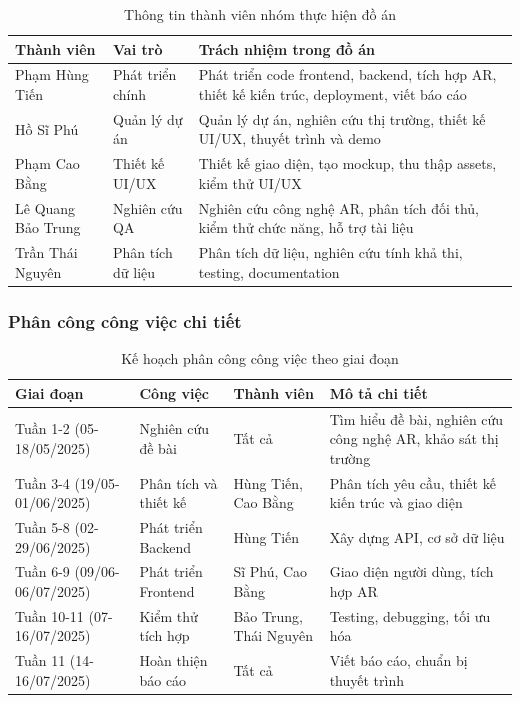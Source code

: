 \documentclass[12pt,a4paper]{article}
\begin{document}
\begin{table}[H]
\centering
\caption{Thông tin thành viên nhóm thực hiện đồ án}
\label{tab:team-members}
\begin{tabular}{@{}>{\raggedright\arraybackslash}p{3cm}>{\raggedright\arraybackslash}p{3cm}>{\raggedright\arraybackslash}p{6cm}@{}}
\toprule
\textbf{Thành viên} & \textbf{Vai trò} & \textbf{Trách nhiệm trong đồ án} \\
\midrule
Phạm Hùng Tiến & Phát triển chính & Phát triển code frontend, backend, tích hợp AR, thiết kế kiến trúc, deployment, viết báo cáo \\
Hồ Sĩ Phú & Quản lý dự án & Quản lý dự án, nghiên cứu thị trường, thiết kế UI/UX, thuyết trình và demo \\
Phạm Cao Bằng & Thiết kế UI/UX & Thiết kế giao diện, tạo mockup, thu thập assets, kiểm thử UI/UX \\
Lê Quang Bảo Trung & Nghiên cứu QA & Nghiên cứu công nghệ AR, phân tích đối thủ, kiểm thử chức năng, hỗ trợ tài liệu \\
Trần Thái Nguyên & Phân tích dữ liệu & Phân tích dữ liệu, nghiên cứu tính khả thi, testing, documentation \\
\bottomrule
\end{tabular}
\end{table}

\subsubsection{Phân công công việc chi tiết}

\begin{table}[H]
\centering
\caption{Kế hoạch phân công công việc theo giai đoạn}
\label{tab:work-allocation}
\begin{tabular}{@{}>{\raggedright\arraybackslash}p{2cm}>{\raggedright\arraybackslash}p{3cm}>{\raggedright\arraybackslash}p{2cm}>{\raggedright\arraybackslash}p{5cm}@{}}
\toprule
\textbf{Giai đoạn} & \textbf{Công việc} & \textbf{Thành viên} & \textbf{Mô tả chi tiết} \\
\midrule
Tuần 1-2 (05-18/05/2025) & Nghiên cứu đề bài & Tất cả & Tìm hiểu đề bài, nghiên cứu công nghệ AR, khảo sát thị trường \\
Tuần 3-4 (19/05-01/06/2025) & Phân tích và thiết kế & Hùng Tiến, Cao Bằng & Phân tích yêu cầu, thiết kế kiến trúc và giao diện \\
Tuần 5-8 (02-29/06/2025) & Phát triển Backend & Hùng Tiến & Xây dựng API, cơ sở dữ liệu \\
Tuần 6-9 (09/06-06/07/2025) & Phát triển Frontend & Sĩ Phú, Cao Bằng & Giao diện người dùng, tích hợp AR \\
Tuần 10-11 (07-16/07/2025) & Kiểm thử tích hợp & Bảo Trung, Thái Nguyên & Testing, debugging, tối ưu hóa \\
Tuần 11 (14-16/07/2025) & Hoàn thiện báo cáo & Tất cả & Viết báo cáo, chuẩn bị thuyết trình \\
\bottomrule
\end{tabular}
\end{table}
\end{document}
